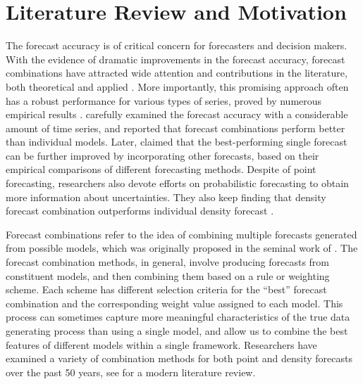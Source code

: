 \documentclass{monashthesis}
\begin{document}
\hypertarget{literature-review-and-motivation}{%
\section{Literature Review and Motivation}\label{literature-review-and-motivation}}

The forecast accuracy is of critical concern for forecasters and decision makers. With the evidence of dramatic improvements in the forecast accuracy, forecast combinations have attracted wide attention and contributions in the literature, both theoretical and applied \autocite{C89,T06}. More importantly, this promising approach often has a robust performance for various types of series, proved by numerous empirical results \autocite{GA11}. \textcite{MACF82} carefully examined the forecast accuracy with a considerable amount of time series, and reported that forecast combinations perform better than individual models. Later, \textcite{SW98} claimed that the best-performing single forecast can be further improved by incorporating other forecasts, based on their empirical comparisons of different forecasting methods. Despite of point forecasting, researchers also devote efforts on probabilistic forecasting to obtain more information about uncertainties. They also keep finding that density forecast combination outperforms individual density forecast \autocites[e.g.,][]{HM07,GA11}.

Forecast combinations refer to the idea of combining multiple forecasts generated from possible models, which was originally proposed in the seminal work of \textcite{BG69}. The forecast combination methods, in general, involve producing forecasts from constituent models, and then combining them based on a rule or weighting scheme. Each scheme has different selection criteria for the ``best'' forecast combination and the corresponding weight value assigned to each model. This process can sometimes capture more meaningful characteristics of the true data generating process than using a single model, and allow us to combine the best features of different models within a single framework. Researchers have examined a variety of combination methods for both point and density forecasts over the past 50 years, see \textcite{WHLK22} for a modern literature review.
\end{document}
